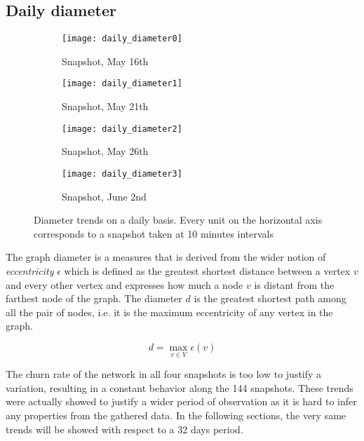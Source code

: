 	\subsection{Daily diameter}
	
		\begin{figure}[h]
		\centering
		\begin{subfigure}{0.45\textwidth}
			\centering
			\texttt{[image: daily\_diameter0]}
			\caption{Snapshot, May 16th}
			\label{daily_diameter0}
		\end{subfigure}
		\begin{subfigure}{0.45\textwidth}
			\centering
			\texttt{[image: daily\_diameter1]}
			\caption{Snapshot, May 21th}
			\label{daily_diameter1}
		\end{subfigure}
		\begin{subfigure}{0.45\textwidth}
			\centering
			\texttt{[image: daily\_diameter2]}
			\caption{Snapshot, May 26th}
			\label{daily_diameter2}
		\end{subfigure}
		\begin{subfigure}{0.45\textwidth}
			\centering
			\texttt{[image: daily\_diameter3]}
			\caption{Snapshot, June 2nd}
			\label{daily_diameter3}
		\end{subfigure}
		
		\caption{Diameter trends on a daily basis. Every unit on the horizontal axis corresponds to a snapshot taken at 10 minutes intervals}
		\label{daily_diameter}
	\end{figure}
	
	The graph diameter is a measures that is derived from the wider notion of \textit{eccentricity} $\epsilon$ which is defined as the greatest shortest distance between a vertex \(v\) and every other vertex and expresses how much a node \(v\) is distant from the farthest node of the graph. The diameter \(d\) is the greatest shortest path among all the pair of nodes, i.e. it is the maximum eccentricity of any vertex in the graph.
	
	\[d = \max_{v \in V} \epsilon(v)\]
	
	The churn rate of the network in all four snapshots is too low to justify a variation, resulting in a constant behavior along the 144 snapshots. These trends were actually showed to justify a wider period of observation as it is hard to infer any properties from the gathered data. In the following sections, the very same trends will be showed with respect to a 32 days period. 

